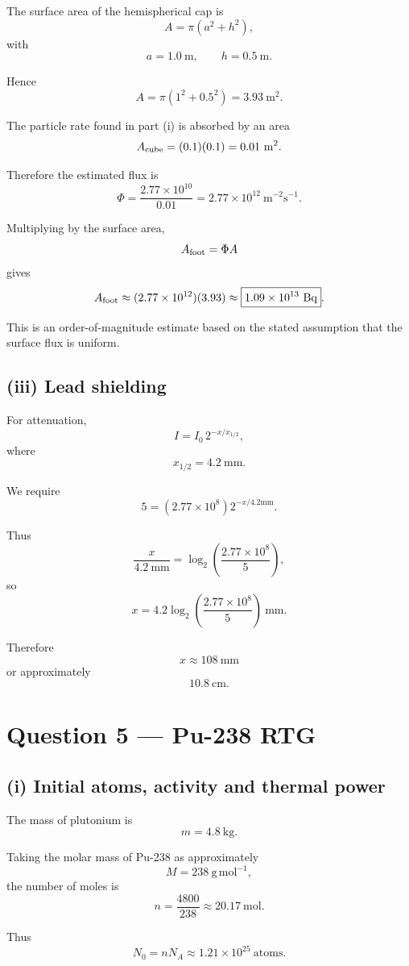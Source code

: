 \documentclass[11pt,a4paper]{article}
\begin{document}
The surface area of the hemispherical cap is
\[
A=\pi(a^2+h^2),
\]
with
\[
a=1.0\ \mathrm m,
\qquad
h=0.5\ \mathrm m.
\]

Hence
\[
A
=
\pi(1^2+0.5^2)
=
\boxed{3.93\ \mathrm{m^2}}.
\]

The particle rate found in part (i) is absorbed by an area
\[
A_{\rm cube}=(0.1)(0.1)=0.01\ \mathrm{m^2}.
\]

Therefore the estimated flux is
\[
\Phi
=
\frac{2.77\times10^{10}}{0.01}
=
2.77\times10^{12}\ \mathrm{m^{-2}s^{-1}}.
\]

Multiplying by the surface area,
\[
A_{\rm foot}
=
\Phi A
\]
gives
\[
A_{\rm foot}
\approx
(2.77\times10^{12})(3.93)
\approx
\boxed{1.09\times10^{13}\ \mathrm{Bq}}.
\]

This is an order-of-magnitude estimate based on the stated assumption that the
surface flux is uniform.

\subsection{(iii) Lead shielding}

For attenuation,
\[
I=I_0\,2^{-x/x_{1/2}},
\]
where
\[
x_{1/2}=4.2\ \mathrm{mm}.
\]

We require
\[
5
=
(2.77\times10^8)
2^{-x/4.2\mathrm{mm}}.
\]

Thus
\[
\frac{x}{4.2\ \mathrm{mm}}
=
\log_2\left(\frac{2.77\times10^8}{5}\right),
\]
so
\[
x
=
4.2
\log_2\left(\frac{2.77\times10^8}{5}\right)\ \mathrm{mm}.
\]

Therefore
\[
\boxed{x\approx108\ \mathrm{mm}}
\]
or approximately
\[
\boxed{10.8\ \mathrm{cm}}.
\]

\section{Question 5 --- Pu-238 RTG}

\subsection{(i) Initial atoms, activity and thermal power}

The mass of plutonium is
\[
m=4.8\ \mathrm{kg}.
\]

Taking the molar mass of Pu-238 as approximately
\[
M=238\ \mathrm{g\,mol^{-1}},
\]
the number of moles is
\[
n=\frac{4800}{238}\approx20.17\ \mathrm{mol}.
\]

Thus
\[
N_0=nN_A
\approx
\boxed{1.21\times10^{25}\ \text{atoms}}.
\]
\end{document}
